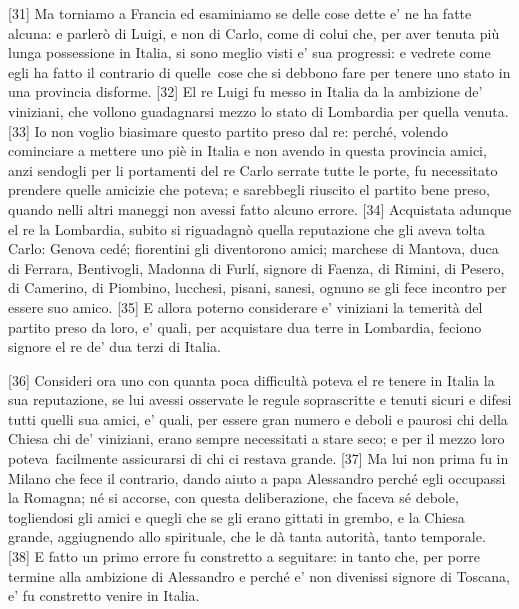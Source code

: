 {[}31{]} Ma torniamo a Francia ed esaminiamo se delle cose dette e' ne
ha fatte alcuna: e parlerò di Luigi, e non di Carlo, come di colui che,
per aver tenuta più lunga possessione in Italia, si sono meglio visti e'
sua progressi: e vedrete come egli ha fatto il contrario di quelle\est\ cose
che si debbono fare per tenere uno stato in una provincia disforme.
{[}32{]} El re Luigi fu messo in Italia da la ambizione de' viniziani,
che vollono guadagnarsi mezzo lo stato di Lombardia per quella venuta.
{[}33{]} Io non voglio biasimare questo partito preso dal re: perché,
volendo cominciare a mettere uno piè in Italia e non avendo in questa
provincia amici, anzi sendogli per li portamenti del re Carlo serrate
tutte le porte, fu necessitato prendere quelle amicizie che poteva; e
sarebbegli riuscito el partito bene preso, quando nelli altri maneggi
non avessi fatto alcuno errore. {[}34{]} Acquistata adunque el re la
Lombardia, subito si riguadagnò quella reputazione che gli aveva tolta
Carlo: Genova cedé; fiorentini gli diventorono amici; marchese di
Mantova, duca di Ferrara, Bentivogli, Madonna di Furlí, signore di
Faenza, di Rimini, di Pesero, di Camerino, di Piombino, lucchesi,
pisani, sanesi, ognuno se gli fece incontro per essere suo amico.
{[}35{]} E allora poterno considerare e' viniziani la temerità del
partito preso da loro, e' quali, per acquistare dua terre in Lombardia,
feciono signore el re de' dua terzi di Italia.

{[}36{]} Consideri ora uno con quanta poca difficultà poteva el re
tenere in Italia la sua reputazione, se lui avessi osservate le regule
soprascritte e tenuti sicuri e difesi tutti quelli sua amici, e' quali,
per essere gran numero e deboli e paurosi chi della Chiesa chi de'
viniziani, erano sempre necessitati a stare seco; e per il mezzo loro
poteva\est\ facilmente assicurarsi di chi ci restava grande. {[}37{]} Ma lui
non prima fu in Milano che fece il contrario, dando aiuto a papa
Alessandro perché egli occupassi la Romagna; né si accorse, con questa
deliberazione, che faceva sé debole, togliendosi gli amici e quegli che
se gli erano gittati in grembo, e la Chiesa grande, aggiugnendo allo
spirituale, che le dà tanta autorità, tanto temporale. {[}38{]} E fatto
un primo errore fu constretto a seguitare: in tanto che, per porre
termine alla ambizione di Alessandro e perché e' non divenissi signore
di Toscana, e' fu constretto venire in Italia.


